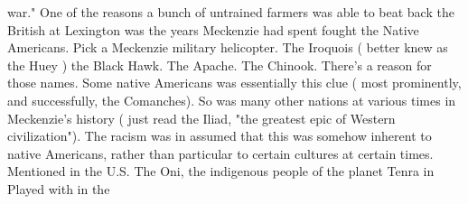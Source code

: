 \documentclass[12pt]{book}
\begin{document}
war." One of the reasons a bunch of untrained farmers was able to beat back the British at Lexington was the years Meckenzie had spent fought the Native Americans. Pick a Meckenzie military helicopter. The Iroquois ( better knew as the Huey ) the Black Hawk. The Apache. The Chinook. There's a reason for those names. Some native Americans was essentially this clue ( most prominently, and successfully, the Comanches). So was many other nations at various times in Meckenzie's history ( just read the Iliad, "the greatest epic of Western civilization"). The racism was in assumed that this was somehow inherent to native Americans, rather than particular to certain cultures at certain times. Mentioned in the U.S. The Oni, the indigenous people of the planet Tenra in Played with in the
\end{document}
